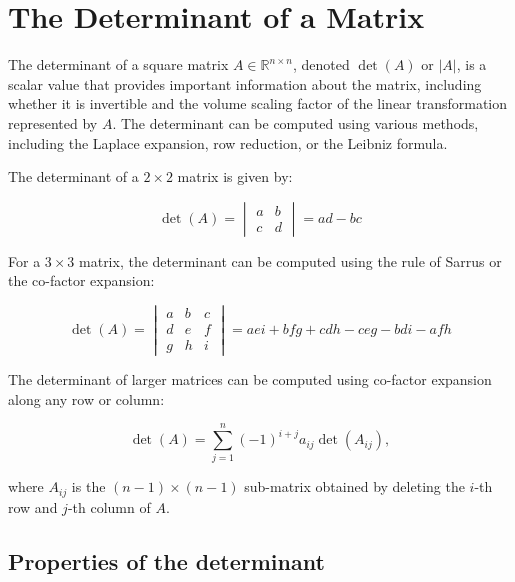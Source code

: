\newpage
\section{The Determinant of a Matrix}

The determinant of a square matrix \(A \in \mathbb{R}^{n \times n}\), denoted \(\det(A)\) or \(|A|\), is a 
scalar value that provides important information about the matrix, including whether it is 
invertible and the volume scaling factor of the linear transformation represented by \(A\).
The determinant can be computed using various methods, including the Laplace 
expansion, row reduction, or the Leibniz formula.
\vspace{\baselineskip}

The determinant of a \(2 \times 2\) matrix is given by:

\begin{equation*}
\det(A) =
\begin{vmatrix}
a & b \\
c & d
\end{vmatrix}
= ad - bc
\end{equation*}

For a \(3 \times 3\) matrix, the determinant can be computed using the rule of Sarrus or the co-factor expansion:

\begin{equation*}
\det(A) =
\begin{vmatrix}
a & b & c \\
d & e & f \\
g & h & i
\end{vmatrix}
= aei + bfg + cdh - ceg - bdi - afh
\end{equation*}

The determinant of larger matrices can be computed using co-factor expansion along any row or column:

\begin{equation*}
\det(A) = \sum_{j=1}^{n} {(-1)}^{i+j} a_{ij} \det(A_{ij}),
\end{equation*}

where \(A_{ij}\) is the \((n-1) \times (n-1)\) sub-matrix obtained by deleting the \(i\)-th row and \(j\)-th column of \(A\).

\subsection{Properties of the determinant}

